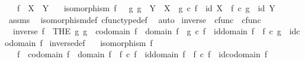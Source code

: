 \begin{isabellebody}
\ \ \ {\isachardoublequoteopen}f\ {\isacharcolon}{\kern0pt}\ X\ {\isasymrightarrow}\ Y{\isachardoublequoteclose}\isanewline
\ \ \ {\isachardoublequoteopen}isomorphism\ f\ {\isasymlongleftrightarrow}\ {\isacharparenleft}{\kern0pt}{\isasymexists}\ g{\isachardot}{\kern0pt}\ g\ {\isacharcolon}{\kern0pt}\ Y\ {\isasymrightarrow}\ X\ {\isasymand}\ g\ {\isasymcirc}\isactrlsub c\ f\ {\isacharequal}{\kern0pt}\ id\ X\ {\isasymand}\ f\ {\isasymcirc}\isactrlsub c\ g\ {\isacharequal}{\kern0pt}\ id\ Y{\isacharparenright}{\kern0pt}{\isachardoublequoteclose}\isanewline
%
\isadelimproof
\ \ %
\endisadelimproof
%
\isatagproof
{}\isamarkupfalse%
\ assms\ \isamarkupfalse%
\ isomorphism{\isacharunderscore}{\kern0pt}def{}\ cfunc{\isacharunderscore}{\kern0pt}type{\isacharunderscore}{\kern0pt}def\ \isamarkupfalse%
\ auto%
\endisatagproof
{\isafoldproof}%
%
\isadelimproof
\isanewline
%
\endisadelimproof
\isanewline
{}\isamarkupfalse%
\ inverse\ {\isacharcolon}{\kern0pt}{\isacharcolon}{\kern0pt}\ {\isachardoublequoteopen}cfunc\ {\isasymRightarrow}\ cfunc{\isachardoublequoteclose}\ {\isacharparenleft}{\kern0pt}{\isachardoublequoteopen}{\isacharunderscore}{\kern0pt}\isactrlbold {\isasyminverse}{\isachardoublequoteclose}\ {\isacharbrackleft}{\kern0pt}{}{}{}{}{\isacharbrackright}{\kern0pt}\ {}{}{}{\isacharparenright}{\kern0pt}\ \isanewline
\ \ {\isachardoublequoteopen}inverse\ f\ {\isacharequal}{\kern0pt}\ {\isacharparenleft}{\kern0pt}THE\ g{\isachardot}{\kern0pt}\ g\ {\isacharcolon}{\kern0pt}\ codomain\ f\ {\isasymrightarrow}\ domain\ f\ {\isasymand}\ g\ {\isasymcirc}\isactrlsub c\ f\ {\isacharequal}{\kern0pt}\ id{\isacharparenleft}{\kern0pt}domain\ f{\isacharparenright}{\kern0pt}\ {\isasymand}\ f\ {\isasymcirc}\isactrlsub c\ g\ {\isacharequal}{\kern0pt}\ id{\isacharparenleft}{\kern0pt}codomain\ f{\isacharparenright}{\kern0pt}{\isacharparenright}{\kern0pt}{\isachardoublequoteclose}\isanewline
\isanewline
{}\isamarkupfalse%
\ inverse{\isacharunderscore}{\kern0pt}def{}{\isacharcolon}{\kern0pt}\isanewline
\ \ \ {\isachardoublequoteopen}isomorphism\ f{\isachardoublequoteclose}\isanewline
\ \ \ {\isachardoublequoteopen}f\isactrlbold {\isasyminverse}\ {\isacharcolon}{\kern0pt}\ codomain\ f\ {\isasymrightarrow}\ domain\ f\ {\isasymand}\ f\isactrlbold {\isasyminverse}\ {\isasymcirc}\isactrlsub c\ f\ {\isacharequal}{\kern0pt}\ id{\isacharparenleft}{\kern0pt}domain\ f{\isacharparenright}{\kern0pt}\ {\isasymand}\ f\ {\isasymcirc}\isactrlsub c\ f\isactrlbold {\isasyminverse}\ {\isacharequal}{\kern0pt}\ id{\isacharparenleft}{\kern0pt}codomain\ f{\isacharparenright}{\kern0pt}{\isachardoublequoteclose}\isanewline

\end{isabellebody}
